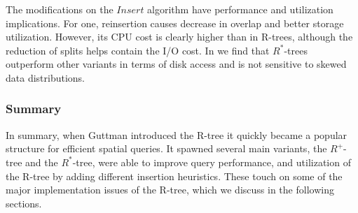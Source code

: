 The modifications on the $Insert$ algorithm have performance and utilization implications. 
For one, reinsertion causes decrease in overlap and better storage utilization. However,
its CPU cost is clearly higher than in R-trees, although the reduction of splits helps 
contain the I/O cost. In \cite{Beckmann:1990:RER:93597.98741} we find that $R^{*}$-trees outperform other variants 
in terms of disk access and is not sensitive to skewed data distributions. 


\subsubsection{Summary}
In summary, when Guttman introduced the R-tree it quickly became a popular structure
for efficient spatial queries. It spawned several main variants, the $R^{+}$-tree
and the $R^{*}$-tree, were able to improve query performance, and utilization of
the R-tree by adding different insertion heuristics. These touch on some of the 
major implementation issues of the R-tree, which we discuss in the following 
sections.

